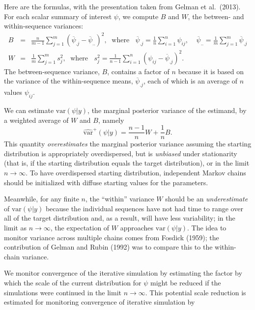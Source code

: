 \documentclass[11pt]{article}
\begin{document}
Here are the formulas, with the presentation taken from Gelman et al.\ (2013).  For each scalar summary of interest $\psi$, we compute $B$ and $W$, the between- and within-sequence variances:
\begin{eqnarray*}
B \!\!&=&\!\!
 \frac{n}{m-1}\sum_{j=1}^{m}(\overline{\psi}_{.j}-\overline{\psi}_{..})^2,
\;\mbox{ where }\;\;\overline{\psi}_{.j}=\frac{1}{n}\sum_{i=1}^n \psi_{ij},\;\;
\;\;\overline{\psi}_{..} = \frac{1}{m}\sum_{j=1}^m\overline{\psi}_{.j}\\
W \!\!&=&\!\!
 \frac{1}{m}\sum_{j=1}^{m}s_j^2, \;\mbox{ where }\;\; s_j^2=\frac{1}{n-1}
\sum_{i=1}^n (\psi_{ij}-\overline{\psi}_{.j})^2.
\end{eqnarray*}
The between-sequence variance, $B$, contains a factor of $n$ because it is based on the variance of the within-sequence means, $\overline{\psi}_{.j}$, each of which is an average of $n$ values $\psi_{ij}$.

We can estimate $\mbox{var}(\psi|y)$, the marginal posterior variance of the estimand, by a weighted average of $W$ and $B$, namely
\begin{equation}\label{hatsig}
\widehat{\mbox{var}}^+(\psi|y)=\frac{n-1}{n}W + \frac{1}{n}B.
\end{equation}
This quantity {\em overestimates}
the marginal posterior variance assuming the starting distribution
is appropriately overdispersed, but is {\em unbiased} under
stationarity (that is, if the starting distribution equals the target
distribution), or
in the limit $n\rightarrow\infty$.
To have overdispersed starting distribution, independent Markov chains
should be initialized with diffuse starting values for the parameters.

Meanwhile, for any finite $n$, the ``within'' variance $W$ should be an 
{\em underestimate} of $\mbox{var}(\psi|y)$ because the individual sequences 
have not had time to range over all of the target distribution and, as a result,
will have less variability; in the limit as $n\rightarrow\infty$, the
expectation of $W$ approaches $\mbox{var}(\psi|y)$. The idea to monitor variance 
across multiple chains comes from Fosdick (1959); the contribution of Gelman and 
Rubin (1992) was to compare this to the within-chain variance.

We monitor convergence of the iterative simulation by estimating
the factor by which the scale of the current distribution for $\psi$
might be reduced if the simulations were continued in the limit
$n\rightarrow\infty$. This potential scale reduction is estimated for 
monitoring convergence of iterative simulation by
\end{document}
